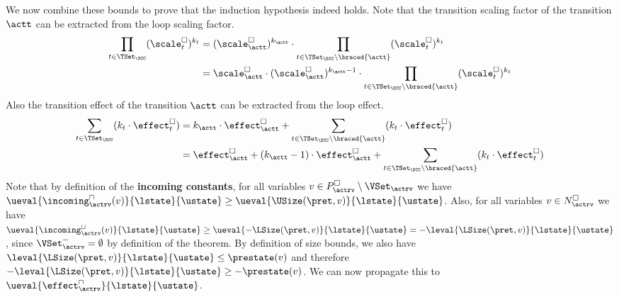 We now combine these bounds to prove that the induction hypothesis indeed holds.
Note that the transition scaling factor of the transition $\actt$ can be extracted from the loop scaling factor.
\begin{equation} \label{eq:scaling_factor_reduction}
  \begin{split}
  \prod_{t \in \TSet_\SCC} (\scale^\square_t)^{k_t} &= (\scale^\square_\actt)^{k_\actt} \cdot \prod_{t \in \TSet_\SCC \setminus \braced{\actt}} (\scale^\square_t)^{k_t} \\
  &= \scale^\square_\actt \cdot (\scale^\square_\actt)^{k_\actt - 1} \cdot \prod_{t \in \TSet_\SCC \setminus \braced{\actt}} (\scale^\square_t)^{k_t}
  \end{split}
\end{equation}
Also the transition effect of the transition $\actt$ can be extracted from the loop effect.
\begin{equation} \label{eq:input_reduction}
  \begin{split}
  \sum_{t \in \TSet_\SCC} (k_t \cdot \effect^\square_t)
  & = k_\actt \cdot \effect^\square_\actt + \sum_{t \in \TSet_\SCC \setminus \braced{\actt}} (k_t \cdot \effect^\square_t) \\
  & = \effect^\square_\actt
    + (k_\actt - 1) \cdot \effect^\square_\actt
    + \sum_{t \in \TSet_\SCC \setminus \braced{\actt}} (k_t \cdot \effect^\square_t)
  \end{split}
\end{equation}
Note that by definition of the \textbf{incoming constants}, for all variables $v \in P^\square_\actrv \setminus \VSet_\actrv$ we have $\ueval{\incoming^\sqcap_\actrv(v)}{\lstate}{\ustate} \geq \ueval{\USize(\pret, v)}{\lstate}{\ustate}$.
Also, for all variables $v \in N^\square_\actrv$ we have $\ueval{\incoming^\sqcup_\actrv(v)}{\lstate}{\ustate} \geq \ueval{-\LSize(\pret, v)}{\lstate}{\ustate} = -\leval{\LSize(\pret, v)}{\lstate}{\ustate}$, since $\VSet^-_\actrv = \emptyset$ by definition of the theorem.
By definition of size bounds, we also have $\leval{\LSize(\pret, v)}{\lstate}{\ustate} \leq \prestate(v)$ and therefore $-\leval{\LSize(\pret, v)}{\lstate}{\ustate} \geq -\prestate(v)$.
We can now propagate this to $\ueval{\effect^\sqcap_\actrv}{\lstate}{\ustate}$.

